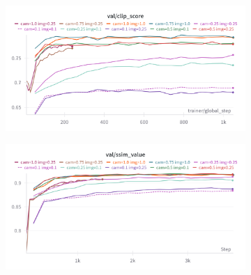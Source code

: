 \begin{figure}[htbp]
  \centering
  \begin{subfigure}[b]{0.48\textwidth}
    \centering
    \includegraphics[width=\textwidth]{images/experiments/cam_img/clip_score.png}
    \label{fig:exp_cond_clip}
  \end{subfigure}
  \hfill
  \begin{subfigure}[b]{0.48\textwidth}
    \centering
    \includegraphics[width=\textwidth]{images/experiments/cam_img/ssim.png}
    \label{fig:exp_cond_ssim}
  \end{subfigure}
  

\end{figure}
